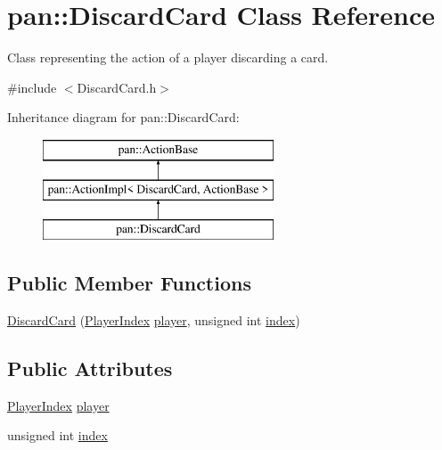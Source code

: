 \hypertarget{classpan_1_1_discard_card}{}\section{pan\+:\+:Discard\+Card Class Reference}
\label{classpan_1_1_discard_card}


Class representing the action of a player discarding a card.  




{\ttfamily \#include $<$Discard\+Card.\+h$>$}

Inheritance diagram for pan\+:\+:Discard\+Card\+:\begin{figure}[H]
\begin{center}
\leavevmode
\includegraphics[height=3.000000cm]{classpan_1_1_discard_card}
\end{center}
\end{figure}
\subsection*{Public Member Functions}
\begin{DoxyCompactItemize}
\item 
\hyperlink{classpan_1_1_discard_card_a5a4f4d975057d33f91e857a1b36b275b}{Discard\+Card} (\hyperlink{namespacepan_a0cdabf874fbf1bb3a1f0152d108c2909}{Player\+Index} \hyperlink{classpan_1_1_discard_card_a92d202c3983f09cac6ad0350b10359a9}{player}, unsigned int \hyperlink{classpan_1_1_discard_card_a62efd70c54ac4e21ec4d5c719bd8ef23}{index})
\end{DoxyCompactItemize}
\subsection*{Public Attributes}
\begin{DoxyCompactItemize}
\item 
\hyperlink{namespacepan_a0cdabf874fbf1bb3a1f0152d108c2909}{Player\+Index} \hyperlink{classpan_1_1_discard_card_a92d202c3983f09cac6ad0350b10359a9}{player}
\item 
unsigned int \hyperlink{classpan_1_1_discard_card_a62efd70c54ac4e21ec4d5c719bd8ef23}{index}
\end{DoxyCompactItemize}


